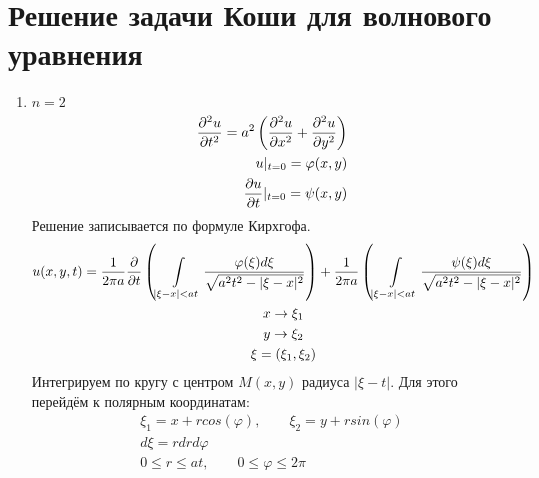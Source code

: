 \documentclass[../main.tex]{subfiles}
\begin{document}
\section{Решение задачи Коши для волнового уравнения}
\begin{enumerate}
	\item $n=2$
	      \begin{equation}
		      \label{eq:2.7.1_z}
		      \begin{split}
			      \frac{\partial ^2u}{\partial t^2} = a^2\left(\frac{\partial ^2u}{\partial x^2}+\frac{\partial ^2u}{\partial y^2}\right)\\
			      u|_{t=0} = \varphi(x,y)\\
			      \frac{\partial u}{\partial t}|_{t=0} = \psi(x,y)
		      \end{split}
	      \end{equation}
	      Решение записывается по формуле Кирхгофа.
	      \begin{gather*}
		      u(x,y,t) = \frac{1}{2\pi a}\frac{\partial  }{\partial t}\left(
		      \int\displaylimits_{|\xi-x|<at} \frac{\varphi(\xi)d\xi}{\sqrt{a^2t^2 - |\xi-x|^2}}\right)
		      +
		      \frac{1}{2\pi a}\left(
		      \int\displaylimits_{|\xi-x|<at} \frac{\psi(\xi)d\xi}{\sqrt{a^2t^2 - |\xi-x|^2}}\right)\\
		      x \rightarrow \xi_1\\
		      y \rightarrow \xi_2\\
		      \xi = (\xi_1,\xi_2)
	      \end{gather*}
	      Интегрируем по кругу с центром $M(x,y)$ радиуса $|\xi-t|$. Для этого перейдём к
	      полярным координатам:
	      \begin{gather*}
		      \xi_1 = x + r cos(\varphi), \qquad \xi_2 = y + r sin(\varphi)\\
		      d\xi = r dr d\varphi \\
		      0 \leq r \leq at, \qquad 0 \leq \varphi \leq 2\pi
	      \end{gather*}


\end{enumerate}
\end{document}
